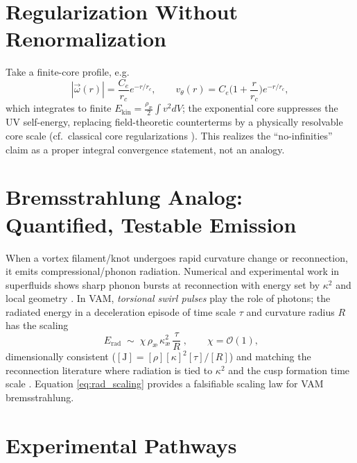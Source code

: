 \documentclass[a4paper,12pt]{article}
\begin{document}
    \medskip

    \section{Regularization Without Renormalization}
    \label{sec:regularization}

    Take a finite-core profile, e.g.
    \begin{equation}
        |\vec\omega(r)|=\frac{C_e}{r_c}e^{-r/r_c},\qquad
        v_\theta(r)=C_e\Big(1+\frac{r}{r_c}\Big)e^{-r/r_c},
    \end{equation}
    which integrates to finite $E_\text{kin}=\frac{\rho_\text{\ae}}{2}\int v^2 dV$; the exponential core suppresses the UV self-energy, replacing field-theoretic counterterms by a physically resolvable core scale (cf.\ classical core regularizations \cite{Saffman1992,Batchelor1967}). This realizes the “no-infinities” claim as a proper integral convergence statement, not an analogy.

    \medskip

    \section{Bremsstrahlung Analog: Quantified, Testable Emission}
    \label{sec:bremsstrahlung}

    When a vortex filament/knot undergoes rapid curvature change or reconnection, it emits compressional/phonon radiation. Numerical and experimental work in superfluids shows sharp phonon bursts at reconnection with energy set by $\kappa^2$ and local geometry \cite{Leadbeater2001,Zuccher2012,Barenghi2014}. In VAM, \emph{torsional swirl pulses} play the role of photons; the radiated energy in a deceleration episode of time scale $\tau$ and curvature radius $R$ has the scaling
    \begin{equation}
        \boxed{\;E_\text{rad}\;\sim\;\chi\,\rho_\text{\ae}\,\kappa_\text{\ae}^2\,\frac{\tau}{R}\;}\!,
        \qquad \chi=\mathcal O(1),
        \label{eq:rad_scaling}
    \end{equation}
    dimensionally consistent ($[\text{J}]=[\rho] [\kappa]^2 [\tau]/[R]$) and matching the reconnection literature where radiation is tied to $\kappa^2$ and the cusp formation time scale \cite{Leadbeater2001,Zuccher2012}. Equation \eqref{eq:rad_scaling} provides a falsifiable scaling law for VAM bremsstrahlung.

    \medskip

    \section{Experimental Pathways}
    \label{sec:experiments}
\end{document}
